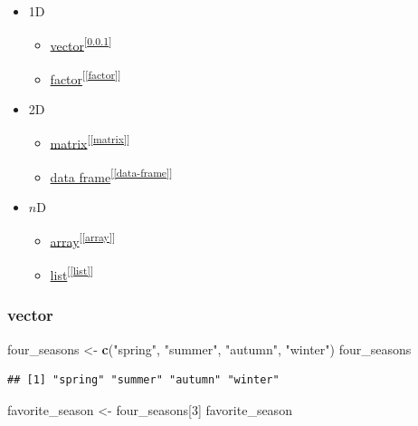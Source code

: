 \documentclass[
]{book}
\newenvironment{Shaded}{\begin{snugshade}}{\end{snugshade}}
\newcommand{\DecValTok}[1]{\textcolor[rgb]{0.00,0.00,0.81}{#1}}
\newcommand{\FunctionTok}[1]{\textcolor[rgb]{0.13,0.29,0.53}{\textbf{#1}}}
\newcommand{\NormalTok}[1]{#1}
\newcommand{\OtherTok}[1]{\textcolor[rgb]{0.56,0.35,0.01}{#1}}
\newcommand{\StringTok}[1]{\textcolor[rgb]{0.31,0.60,0.02}{#1}}
\providecommand{\tightlist}{%
  \setlength{\itemsep}{0pt}\setlength{\parskip}{0pt}}
\theoremstyle{definition}
\theoremstyle{definition}
\theoremstyle{definition}
\theoremstyle{definition}
\theoremstyle{remark}
\begin{document}
\begin{itemize}
\tightlist
\item
  1D

  \begin{itemize}
  \tightlist
  \item
    \hyperref[vector]{vector}\textsuperscript{{[}\ref{vector}{]}}
  \item
    \hyperref[factor]{factor}\textsuperscript{{[}\ref{factor}{]}}
  \end{itemize}
\item
  2D

  \begin{itemize}
  \tightlist
  \item
    \hyperref[matrix]{matrix}\textsuperscript{{[}\ref{matrix}{]}}
  \item
    \hyperref[data-frame]{data frame}\textsuperscript{{[}\ref{data-frame}{]}}
  \end{itemize}
\item
  \(n\)D

  \begin{itemize}
  \tightlist
  \item
    \hyperref[array]{array}\textsuperscript{{[}\ref{array}{]}}
  \item
    \hyperref[list]{list}\textsuperscript{{[}\ref{list}{]}}
  \end{itemize}
\end{itemize}

\subsubsection{vector}\label{vector}

\begin{Shaded}
\begin{Highlighting}[]
\NormalTok{four\_seasons }\OtherTok{\textless{}{-}} \FunctionTok{c}\NormalTok{(}\StringTok{"spring"}\NormalTok{, }\StringTok{"summer"}\NormalTok{, }\StringTok{"autumn"}\NormalTok{, }\StringTok{"winter"}\NormalTok{)}
\NormalTok{four\_seasons}
\end{Highlighting}
\end{Shaded}

\begin{verbatim}
## [1] "spring" "summer" "autumn" "winter"
\end{verbatim}

\begin{Shaded}
\begin{Highlighting}[]
\NormalTok{favorite\_season }\OtherTok{\textless{}{-}}\NormalTok{ four\_seasons[}\DecValTok{3}\NormalTok{]}
\NormalTok{favorite\_season}
\end{Highlighting}
\end{Shaded}
\end{document}
